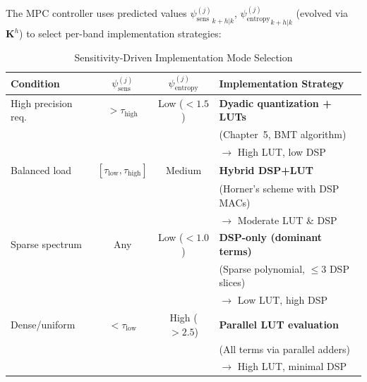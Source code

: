 The MPC controller uses predicted values ${\psi_{\text{sens}}^{(j)}}_{k+h|k}$, ${\psi_{\text{entropy}}^{(j)}}_{k+h|k}$ (evolved via $\mathbf{K}^h$) to select per-band implementation strategies:

\begin{table}[h]
\centering
\caption{Sensitivity-Driven Implementation Mode Selection}
\label{tab:sensitivity_impl_modes}
\begin{tabular}{@{}lccl@{}}
\toprule
\textbf{Condition} & \textbf{$\psi_{\text{sens}}^{(j)}$} & \textbf{$\psi_{\text{entropy}}^{(j)}$} & \textbf{Implementation Strategy} \\
\midrule
High precision req. & $> \tau_{\text{high}}$ & Low ($< 1.5$) & \textbf{Dyadic quantization + LUTs} \\
 & & & (Chapter~5, BMT algorithm) \\
 & & & $\to$ High LUT, low DSP \\
\addlinespace
Balanced load & $[\tau_{\text{low}}, \tau_{\text{high}}]$ & Medium & \textbf{Hybrid DSP+LUT} \\
 & & & (Horner's scheme with DSP MACs) \\
 & & & $\to$ Moderate LUT \& DSP \\
\addlinespace
Sparse spectrum & Any & Low ($< 1.0$) & \textbf{DSP-only (dominant terms)} \\
 & & & (Sparse polynomial, $\leq 3$ DSP slices) \\
 & & & $\to$ Low LUT, high DSP \\
\addlinespace
Dense/uniform & $< \tau_{\text{low}}$ & High ($> 2.5$) & \textbf{Parallel LUT evaluation} \\
 & & & (All terms via parallel adders) \\
 & & & $\to$ High LUT, minimal DSP \\
\bottomrule
\end{tabular}
\end{table}

